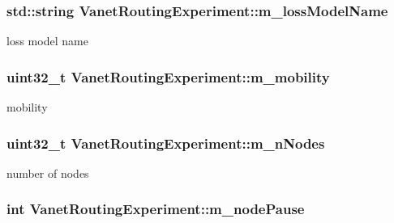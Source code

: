 \subsubsection[{\texorpdfstring{m\+\_\+loss\+Model\+Name}{m_lossModelName}}]{\setlength{\rightskip}{0pt plus 5cm}std\+::string Vanet\+Routing\+Experiment\+::m\+\_\+loss\+Model\+Name\hspace{0.3cm}{\ttfamily [private]}}\hypertarget{classVanetRoutingExperiment_a973b4d1f55f7e425e1564db1cfd503f1}{}\label{classVanetRoutingExperiment_a973b4d1f55f7e425e1564db1cfd503f1}


loss model name 

\subsubsection[{\texorpdfstring{m\+\_\+mobility}{m_mobility}}]{\setlength{\rightskip}{0pt plus 5cm}uint32\+\_\+t Vanet\+Routing\+Experiment\+::m\+\_\+mobility\hspace{0.3cm}{\ttfamily [private]}}\hypertarget{classVanetRoutingExperiment_a1ab9e6d4a9fcfabb7b6fd820a39f63e3}{}\label{classVanetRoutingExperiment_a1ab9e6d4a9fcfabb7b6fd820a39f63e3}


mobility 

\subsubsection[{\texorpdfstring{m\+\_\+n\+Nodes}{m_nNodes}}]{\setlength{\rightskip}{0pt plus 5cm}uint32\+\_\+t Vanet\+Routing\+Experiment\+::m\+\_\+n\+Nodes\hspace{0.3cm}{\ttfamily [private]}}\hypertarget{classVanetRoutingExperiment_ac2bf996dc9fe3163f8a720acbf4f6f85}{}\label{classVanetRoutingExperiment_ac2bf996dc9fe3163f8a720acbf4f6f85}


number of nodes 

\subsubsection[{\texorpdfstring{m\+\_\+node\+Pause}{m_nodePause}}]{\setlength{\rightskip}{0pt plus 5cm}int Vanet\+Routing\+Experiment\+::m\+\_\+node\+Pause\hspace{0.3cm}{\ttfamily [private]}}\hypertarget{classVanetRoutingExperiment_aadb1a32f4804b83f6cc2084432b0514d}{}\label{classVanetRoutingExperiment_aadb1a32f4804b83f6cc2084432b0514d}


